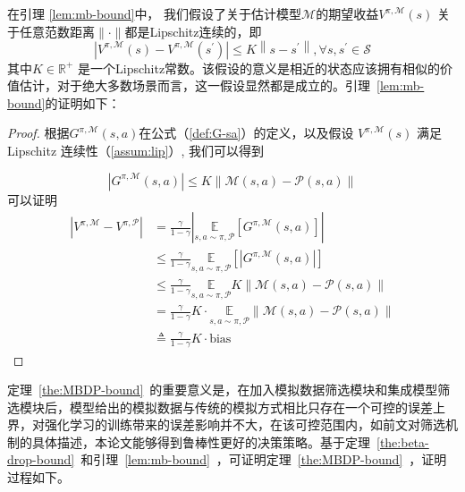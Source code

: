 在引理 \ref{lem:mb-bound}中， 我们假设了关于估计模型$\mathcal{M}$的期望收益${V}^{\pi,\mathcal{M}}(s)$ 关于任意范数距离$\|\cdot\|$都是Lipschitz连续的，即
\begin{equation}\label{assum:lip}
    \left|{V}^{\pi,\mathcal{M}}(s)-{V}^{\pi,\mathcal{M}}(s^{\prime})\right| \leq K\left\|s-s^{\prime}\right\|, \forall s, s^{\prime} \in \mathcal{S}
\end{equation}
其中$K\in \mathbb{R}^+$ 是一个Lipschitz常数。该假设的意义是相近的状态应该拥有相似的价值估计，对于绝大多数场景而言，这一假设显然都是成立的。引理~\ref{lem:mb-bound}的证明如下：

\begin{proof}

根据$G^{\pi,\mathcal{M}}(s,a)$在公式（\ref{def:G-sa}）的定义，以及假设 ${V}^{\pi,\mathcal{M}}(s)$ 满足 Lipschitz 连续性（\ref{assum:lip}）, 我们可以得到

\begin{equation}\label{eq:G-leq}
|G^{\pi,\mathcal{M}}(s,a)|\leq K\|\mathcal{M}(s,a)-\mathcal{P}(s,a)\|
\end{equation}
可以证明
\begin{align}
\left|{V}^{\pi, \mathcal{M}}-{V}^{\pi, \mathcal{P}}\right| &= \frac{\gamma}{1-\gamma}\left|\underset{s,a\sim\pi,\mathcal{P}}{\mathbb{E}}\left[G^{\pi,\mathcal{M}}(s,a)\right]\right|\\
&\leq \frac{\gamma}{1-\gamma}\underset{s,a\sim\pi,\mathcal{P}}{\mathbb{E}}\left[\left|G^{\pi,\mathcal{M}}(s,a)\right|\right]\\
&\leq \frac{\gamma}{1-\gamma}\underset{s,a\sim\pi,\mathcal{P}}{\mathbb{E}}K\|\mathcal{M}(s,a)-\mathcal{P}(s,a)\|\\
&= \frac{\gamma}{1-\gamma}K\cdot\underset{s,a\sim\pi,\mathcal{P}}{\mathbb{E}}\|\mathcal{M}(s,a)-\mathcal{P}(s,a)\|\\
&\triangleq \frac{\gamma}{1-\gamma}K\cdot\mathrm{bias}
\end{align}

\end{proof}

定理~\ref{the:MBDP-bound}~的重要意义是，在加入模拟数据筛选模块和集成模型筛选模块后，模型给出的模拟数据与传统的模拟方式相比只存在一个可控的误差上界，对强化学习的训练带来的误差影响并不大，在该可控范围内，如前文对筛选机制的具体描述，本论文能够得到鲁棒性更好的决策策略。基于定理~\ref{the:beta-drop-bound}~和引理~\ref{lem:mb-bound}~，可证明定理~\ref{the:MBDP-bound}~，证明过程如下。

